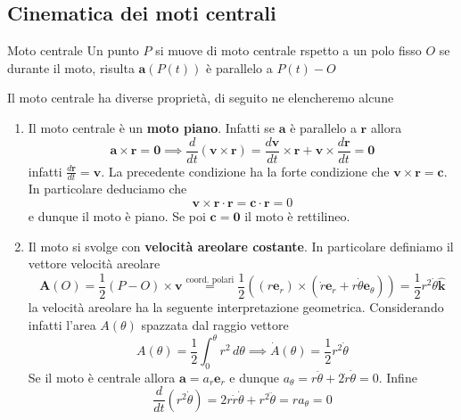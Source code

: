 \subsection{Cinematica dei moti centrali}
\begin{definition}{Moto centrale}
    Un punto \(P\) si muove di moto centrale rspetto a un polo fisso \(O\)  se
    durante il moto, risulta \(\mathbf{a} {(P{(t)})}\) è parallelo a \(P{(t)} -
    O\) 
\end{definition}
Il moto centrale ha diverse proprietà, di seguito ne elencheremo alcune
\begin{enumerate}[label = \arabic*.]
    \item Il moto centrale è un \textbf{moto piano}. Infatti se \(\mathbf{a} \)
        è parallelo a \(\mathbf{r} \) allora 
        \[
          \mathbf{a}  \times  \mathbf{r}  = \mathbf{0} \implies \frac{d}{dt}
          {\left(  \mathbf{v}  \times \mathbf{r}  \right)} = \frac{d\mathbf{v}
          }{dt} \times  \mathbf{r} + \mathbf{v} \times \frac{d\mathbf{r} }{dt} =
          \mathbf{0} 
        \]
        infatti \(\frac{d\mathbf{r} }{dt} = \mathbf{v} \). La precedente
        condizione ha la forte condizione che \(\mathbf{v}  \times \mathbf{r} =
        \mathbf{c}\). In particolare deduciamo che
        \[
            \mathbf{v} \times \mathbf{r} \cdot \mathbf{r}  = \mathbf{c} \cdot
            \mathbf{r} = 0
        \]
        e dunque il moto è piano. Se poi \(\mathbf{c} = \mathbf{0}\) il moto è
        rettilineo. 
    \item Il moto si svolge con \textbf{velocità areolare costante}. In
        particolare definiamo il vettore velocità areolare
        \[
          \mathbf{A} {(O)} = \frac{1}{2}{(P - O)} \times \mathbf{v}
          \overset{\text{coord. polari}}{=} \frac{1}{2} {\left( {(r
          \mathbf{e}_r)} \times {(\dot{r} \mathbf{e} _r + r \dot{\theta}
\mathbf{e} _\theta)}  \right)} = \frac{1}{2} r^2 \dot{\theta} \hat{\mathbf{k} }
        \]
        la velocità areolare ha la seguente interpretazione geometrica.
        Considerando infatti l'area \(A{(\theta)}\) spazzata dal raggio vettore 
        \[
          A{(\theta)} = \frac{1}{2}\int_0^{\theta} r^2\,d\theta \implies
          \dot{A}{(\theta)} =
          \frac{1}{2}r^2\dot{\theta}
        \]
        Se il moto è centrale allora \(\mathbf{a}  = a_r\mathbf{e}_r\) 
        e dunque \(a_\theta = r\ddot{\theta} + 2\dot{r}\dot{\theta} = 0\).
        Infine
        \[
            \frac{d}{dt}{\left( r^2\dot{\theta} \right)} =
            2r\dot{r}\dot{\theta} + r^2\ddot{\theta} = ra_\theta = 0
\]
\end{enumerate}
